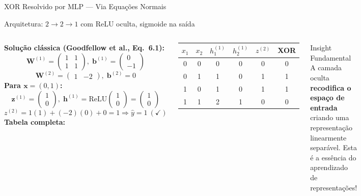 \documentclass[7pt, aspectratio=169,10pt]{beamer}
\newcommand{\bx}{\bm{x}}
\newcommand{\bW}{\bm{W}}
\newcommand{\bb}{\bm{b}}
\newcommand{\bz}{\bm{z}}
\newcommand{\bh}{\bm{h}}
\begin{document}
\begin{frame}{XOR Resolvido por MLP — Via Equações Normais}
\begin{block}{Arquitetura: $2 \to 2 \to 1$ com ReLU oculta, sigmoide na saída}
\end{block}
\begin{columns}[T]
\small
\textbf{Solução clássica (Goodfellow et al., Eq.\ 6.1):}
\[
\bW^{(1)}=\begin{pmatrix}1&1\\1&1\end{pmatrix},\;
\bb^{(1)}=\begin{pmatrix}0\\-1\end{pmatrix}
\]
\[
\bW^{(2)}=\begin{pmatrix}1&-2\end{pmatrix},\;
\bb^{(2)}=0
\]
\textbf{Para $\bx=(0,1)$:}
\[
\bz^{(1)}=\begin{pmatrix}1\\0\end{pmatrix},\;
\bh^{(1)}=\text{ReLU}\!\begin{pmatrix}1\\0\end{pmatrix}=\begin{pmatrix}1\\0\end{pmatrix}
\]
\[
z^{(2)} = 1(1)+(-2)(0)+0 = 1 \Rightarrow \hat{y}=1\ (\checkmark)
\]
\small
\textbf{Tabela completa:}
\begin{center}
\begin{tabular}{cc|cc|c|c}
\toprule
$x_1$ & $x_2$ & $h_1^{(1)}$ & $h_2^{(1)}$ & $z^{(2)}$ & XOR\\
\midrule
0 & 0 & 0 & 0 & 0 & 0 \\
0 & 1 & 1 & 0 & 1 & 1 \\
1 & 0 & 1 & 0 & 1 & 1 \\
1 & 1 & 2 & 1 & 0 & 0 \\
\bottomrule
\end{tabular}
\end{center}
\begin{exampleblock}{Insight Fundamental}
\small
A camada oculta \textbf{recodifica o espaço de entrada} criando uma representação linearmente separável. Esta é a essência do aprendizado de representações!
\end{exampleblock}
\end{columns}
\end{frame}
\end{document}
